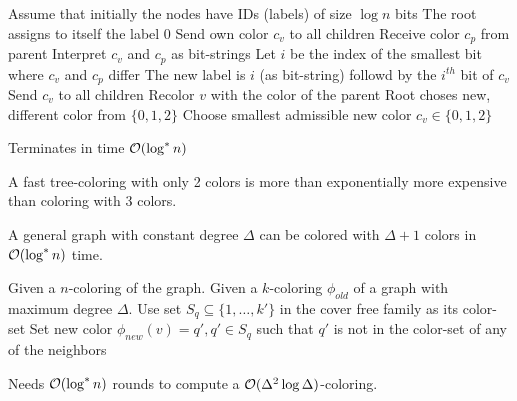 \documentclass[11pt, oneside]{book}   						%
\begin{document}
\begin{algorithm}[H]
\caption{}\label{tcolor}
\begin{algorithmic}[1]
\State Assume that initially the nodes have IDs (labels) of size $\log n$ bits
\State The root assigns to itself the label 0
	\State Send own color $c_v$ to all children
	\Repeat
		\State Receive color $c_p$ from parent
		\State Interpret $c_v$ and $c_p$ as bit-strings
		\State Let $i$ be the index of the smallest bit where $c_v$ and $c_p$ differ
		\State The new label is $i$ (as bit-string) followd by the $i^{th}$ bit of $c_v$
		\State Send $c_v$ to all children
\EndForEach
\ForEach[node $v$]
		\ForEach[node $v$]
			\State Recolor $v$ with the color of the parent
			\State Root choses new, different color from $\{0,1,2\}$
		\EndForEach
			\State Choose smallest admissible new color $c_v\in \{0,1,2\}$
		\EndIf
	\EndFor
\EndForEach
\end{algorithmic}
\end{algorithm}
\begin{mythm} Terminates in time $\mathcal{O}(\log^*n)$\end{mythm}
\begin{myremark}A fast tree-coloring with only 2 colors is more than exponentially more expensive than coloring with 3 colors.
\end{myremark}
\begin{myremark}A general graph with constant degree $\Delta$ can be colored with $\Delta + 1$ colors in $\mathcal{O}(\log^*n)$ time.
\end{myremark}

\begin{algorithm}
\caption{}\label{linial}
\begin{algorithmic}[1]
\State Given a $n$-coloring of the graph.
	\State Given a $k$-coloring $\phi_{old}$ of a graph with maximum degree $\Delta$.
	\ForEach[node $v$ of old color $\phi_{old}(v)=q, q\in \{1, \hdots, k\}$]
		\State Use set $S_q\subseteq\{1, \hdots, k'\}$ in the cover free family as its color-set
		\State Set new color $\phi_{new}(v)=q', q'\in S_q$ such that $q'$ is not in the color-set of any of the neighbors
	\EndForEach
\EndWhile
\end{algorithmic}
\end{algorithm}
\begin{mythm} Needs $\mathcal{O}(\log^* n)$ rounds to compute a $\mathcal{O}(\Delta^2\log \Delta)$-coloring.\end{mythm}
\end{document}
